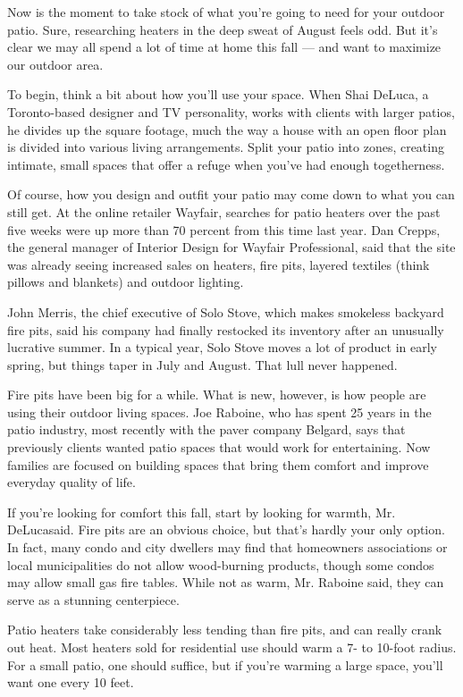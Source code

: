 Now is the moment to take stock of what you're going to need for your
outdoor patio. Sure, researching heaters in the deep sweat of August
feels odd. But it's clear we may all spend a lot of time at home this
fall --- and want to maximize our outdoor area.

To begin, think a bit about how you'll use your space. When Shai DeLuca,
a Toronto-based designer and TV personality, works with clients with
larger patios, he divides up the square footage, much the way a house
with an open floor plan is divided into various living arrangements.
Split your patio into zones, creating intimate, small spaces that offer
a refuge when you've had enough togetherness.

Of course, how you design and outfit your patio may come down to what
you can still get. At the online retailer Wayfair, searches for patio
heaters over the past five weeks were up more than 70 percent from this
time last year. Dan Crepps, the general manager of Interior Design for
Wayfair Professional, said that the site was already seeing increased
sales on heaters, fire pits, layered textiles (think pillows and
blankets) and outdoor lighting.

John Merris, the chief executive of Solo Stove, which makes smokeless
backyard fire pits, said his company had finally restocked its inventory
after an unusually lucrative summer. In a typical year, Solo Stove moves
a lot of product in early spring, but things taper in July and August.
That lull never happened.

Fire pits have been big for a while. What is new, however, is how people
are using their outdoor living spaces. Joe Raboine, who has spent 25
years in the patio industry, most recently with the paver company
Belgard, says that previously clients wanted patio spaces that would
work for entertaining. Now families are focused on building spaces that
bring them comfort and improve everyday quality of life.

If you're looking for comfort this fall, start by looking for warmth,
Mr. DeLucasaid. Fire pits are an obvious choice, but that's hardly your
only option. In fact, many condo and city dwellers may find that
homeowners associations or local municipalities do not allow
wood-burning products, though some condos may allow small gas fire
tables. While not as warm, Mr. Raboine said, they can serve as a
stunning centerpiece.

Patio heaters take considerably less tending than fire pits, and can
really crank out heat. Most heaters sold for residential use should warm
a 7- to 10-foot radius. For a small patio, one should suffice, but if
you're warming a large space, you'll want one every 10 feet.

